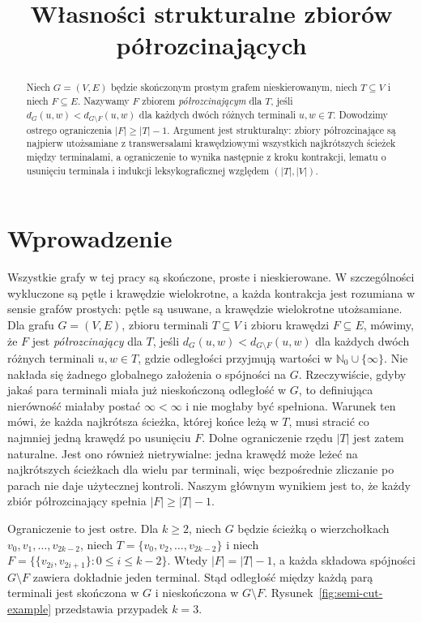 \documentclass[11pt,a4paper]{amsart}
\title{Własności strukturalne zbiorów półrozcinających}
\author{}
\date{}
\theoremstyle{definition}
\theoremstyle{plain}
\newcommand{\dist}[3]{d_{#1}(#2,#3)}
\begin{document}
\begin{abstract}
Niech $G=(V,E)$ będzie skończonym prostym grafem nieskierowanym, niech $T\subseteq V$ i niech $F\subseteq E$. Nazywamy $F$ zbiorem \emph{półrozcinającym} dla $T$, jeśli $\dist{G}{u}{w}<\dist{G\setminus F}{u}{w}$ dla każdych dwóch różnych terminali $u,w\in T$. Dowodzimy ostrego ograniczenia $|F|\ge |T|-1$. Argument jest strukturalny: zbiory półrozcinające są najpierw utożsamiane z transwersalami krawędziowymi wszystkich najkrótszych ścieżek między terminalami, a ograniczenie to wynika następnie z kroku kontrakcji, lematu o usunięciu terminala i indukcji leksykograficznej względem $(|T|,|V|)$.
\end{abstract}

\maketitle

\section{Wprowadzenie}

Wszystkie grafy w tej pracy są skończone, proste i nieskierowane. W szczególności wykluczone są pętle i krawędzie wielokrotne, a każda kontrakcja jest rozumiana w sensie grafów prostych: pętle są usuwane, a krawędzie wielokrotne utożsamiane.
Dla grafu $G=(V,E)$, zbioru terminali $T\subseteq V$ i zbioru krawędzi $F\subseteq E$, mówimy, że $F$ jest \emph{półrozcinający} dla $T$, jeśli $\dist{G}{u}{w}<\dist{G\setminus F}{u}{w}$ dla każdych dwóch różnych terminali $u,w\in T$, gdzie odległości przyjmują wartości w $\mathbb{N}_0\cup\{\infty\}$.
Nie nakłada się żadnego globalnego założenia o spójności na $G$. Rzeczywiście, gdyby jakaś para terminali miała już nieskończoną odległość w $G$, to definiująca nierówność miałaby postać $\infty<\infty$ i nie mogłaby być spełniona. Warunek ten mówi, że każda najkrótsza ścieżka, której końce leżą w $T$, musi stracić co najmniej jedną krawędź po usunięciu $F$.
Dolne ograniczenie rzędu $|T|$ jest zatem naturalne. Jest ono również nietrywialne: jedna krawędź może leżeć na najkrótszych ścieżkach dla wielu par terminali, więc bezpośrednie zliczanie po parach nie daje użytecznej kontroli. Naszym głównym wynikiem jest to, że każdy zbiór półrozcinający spełnia $|F|\ge |T|-1$.

Ograniczenie to jest ostre. Dla $k\ge 2$, niech $G$ będzie ścieżką o wierzchołkach $v_0,v_1,\dots,v_{2k-2}$, niech $T=\{v_0,v_2,\dots,v_{2k-2}\}$ i niech $F=\bigl\{\{v_{2i},v_{2i+1}\}: 0\le i\le k-2\bigr\}$. Wtedy $|F|=|T|-1$, a każda składowa spójności $G\setminus F$ zawiera dokładnie jeden terminal. Stąd odległość między każdą parą terminali jest skończona w $G$ i nieskończona w $G\setminus F$. Rysunek~\ref{fig:semi-cut-example} przedstawia przypadek $k=3$.
\end{document}
